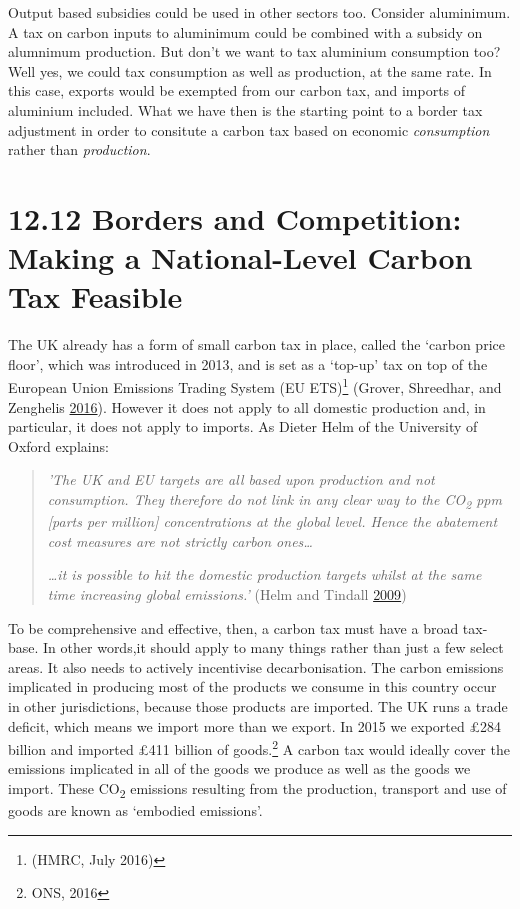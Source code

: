 \documentclass[]{tufte-handout}
\begin{document}
Output based subsidies could be used in other sectors too. Consider
aluminimum. A tax on carbon inputs to aluminimum could be combined with
a subsidy on alumnimum production. But don't we want to tax aluminium
consumption too? Well yes, we could tax consumption as well as
production, at the same rate. In this case, exports would be exempted
from our carbon tax, and imports of aluminium included. What we have
then is the starting point to a border tax adjustment in order to
consitute a carbon tax based on economic \emph{consumption} rather than
\emph{production}.

\hypertarget{borders-and-competition-making-a-national-level-carbon-tax-feasible}{%
\section{12.12 Borders and Competition: Making a National-Level Carbon
Tax
Feasible}\label{borders-and-competition-making-a-national-level-carbon-tax-feasible}}

The UK already has a form of small carbon tax in place, called the
`carbon price floor', which was introduced in 2013, and is set as a
`top-up' tax on top of the European Union Emissions Trading System (EU
ETS)\footnote{(HMRC, July 2016)} (Grover, Shreedhar, and Zenghelis
\protect\hyperlink{ref-Grover2016}{2016}). However it does not apply to
all domestic production and, in particular, it does not apply to
imports. As Dieter Helm of the University of Oxford explains:

\begin{quote}
\emph{'The UK and EU targets are all based upon production and not
consumption. They therefore do not link in any clear way to the
CO\textsubscript{2} ppm {[}parts per million{]} concentrations at the
global level. Hence the abatement cost measures are not strictly carbon
ones\ldots{}}

\emph{\ldots{}it is possible to hit the domestic production targets
whilst at the same time increasing global emissions.'} (Helm and Tindall
\protect\hyperlink{ref-Helm2009}{2009})
\end{quote}

To be comprehensive and effective, then, a carbon tax must have a broad
tax-base. In other words,it should apply to many things rather than just
a few select areas. It also needs to actively incentivise
decarbonisation. The carbon emissions implicated in producing most of
the products we consume in this country occur in other jurisdictions,
because those products are imported. The UK runs a trade deficit, which
means we import more than we export. In 2015 we exported £284 billion
and imported £411 billion of goods.\footnote{ONS, 2016} A carbon tax
would ideally cover the emissions implicated in all of the goods we
produce as well as the goods we import. These CO\textsubscript{2}
emissions resulting from the production, transport and use of goods are
known as `embodied emissions'.
\end{document}
